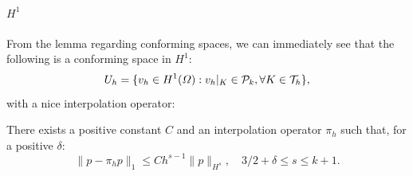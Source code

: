 \paragraph{\texorpdfstring{$H^1$}{H1}} From the lemma regarding conforming spaces, we can immediately see that the following is a conforming space in $H^1$: 
\begin{equation}
    U_h = \{ v_h \in H^1(\Omega): v_h|_K \in \mathcal{P}_k, \forall K\in \mathcal{T}_h\},
\end{equation}
with a nice interpolation operator:
\begin{theorem}
    There exists a positive constant $C$ and an interpolation operator $\pi_h$ such that, for a positive $\delta$: 
    \begin{equation*}
        \|p - \pi_h p \|_1 \leq C h^{s-1} \|p\|_{H^s}, \quad 3/2+\delta \leq s \leq k+1 .
    \end{equation*}
\end{theorem}
